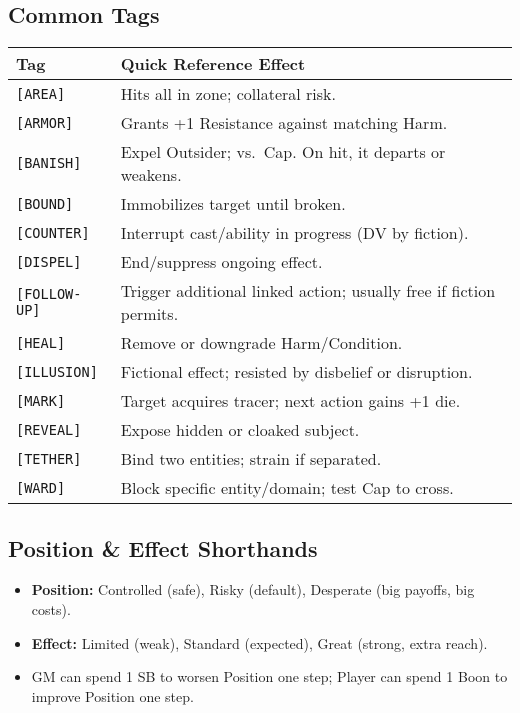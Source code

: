 \subsection{Common Tags}
\begin{center}
\begin{tabular}{|p{3.5cm}|p{10.0cm}|}
\hline
\textbf{Tag} & \textbf{Quick Reference Effect} \\ \hline
\texttt{[AREA]} & Hits all in zone; collateral risk. \\ \hline
\texttt{[ARMOR]} & Grants +1 Resistance against matching Harm. \\ \hline
\texttt{[BANISH]} & Expel Outsider; vs.\ Cap. On hit, it departs or weakens. \\ \hline
\texttt{[BOUND]} & Immobilizes target until broken. \\ \hline
\texttt{[COUNTER]} & Interrupt cast/ability in progress (DV by fiction). \\ \hline
\texttt{[DISPEL]} & End/suppress ongoing effect. \\ \hline
\texttt{[FOLLOW-UP]} & Trigger additional linked action; usually free if fiction permits. \\ \hline
\texttt{[HEAL]} & Remove or downgrade Harm/Condition. \\ \hline
\texttt{[ILLUSION]} & Fictional effect; resisted by disbelief or disruption. \\ \hline
\texttt{[MARK]} & Target acquires tracer; next action gains +1 die. \\ \hline
\texttt{[REVEAL]} & Expose hidden or cloaked subject. \\ \hline
\texttt{[TETHER]} & Bind two entities; strain if separated. \\ \hline
\texttt{[WARD]} & Block specific entity/domain; test Cap to cross. \\ \hline
\end{tabular}
\end{center}

\subsection{Position \& Effect Shorthands}
\begin{itemize}
  \item \textbf{Position:} Controlled (safe), Risky (default), Desperate (big payoffs, big costs).
  \item \textbf{Effect:} Limited (weak), Standard (expected), Great (strong, extra reach).
  \item GM can spend 1 SB to worsen Position one step; Player can spend 1 Boon to improve Position one step.
\end{itemize}

